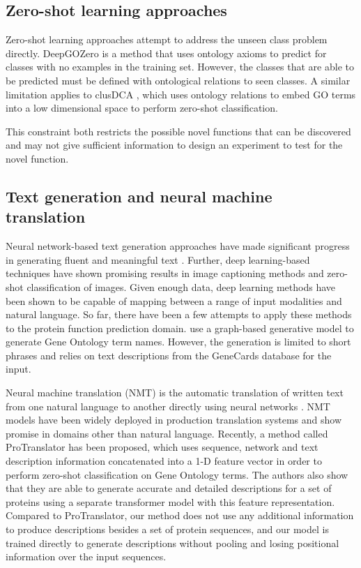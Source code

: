 \documentclass{article}
\begin{document}
	\subsection{Zero-shot learning approaches}
    Zero-shot learning approaches attempt to address the unseen class problem directly.
    DeepGOZero \citep{DeepGOZero} is a method that uses ontology axioms to predict for classes with no examples in the training set.
    However, the classes that are able to be predicted must be defined with ontological relations to seen classes. 
	A similar limitation applies to clusDCA \citep{clusDCA}, which uses ontology relations to embed GO terms into a low dimensional space to perform zero-shot classification.

    This constraint both restricts the possible novel functions that can be discovered and may not give sufficient information to design an experiment to test for the novel function.

    \subsection{Text generation and neural machine translation}
    Neural network-based text generation approaches have made significant progress in generating fluent and meaningful text \citep{fatima2022systematic}. 
    Further, deep learning-based techniques have shown promising results in image captioning methods \citep{hossain2019comprehensive} and zero-shot classification of images\cite{CLIP}.
    Given enough data, deep learning methods have been shown to be capable of mapping between a range of input modalities and natural language.
    So far, there have been a few attempts to apply these methods to the protein function prediction domain.
    \cite{zhang2020automatic} use a graph-based generative model to generate Gene Ontology term names. However, the generation is limited to short phrases and relies on text descriptions from the GeneCards database \cite{GeneCards} for the input.

    Neural machine translation (NMT) is the automatic translation of written text from one natural language to another directly using neural networks \cite{cho2014properties}. NMT models have been widely deployed in production translation systems and show promise in domains other than natural language.
    Recently, a method called ProTranslator \citep{ProTranslator} has been proposed, which uses sequence, network and text description information concatenated into a 1-D feature vector in order to perform zero-shot classification on Gene Ontology terms.
    The authors also show that they are able to generate accurate and detailed descriptions for a set of proteins using a separate transformer model with this feature representation.
    Compared to ProTranslator, our method does not use any additional information to produce descriptions besides a set of protein sequences, and our model is trained directly to generate descriptions without pooling and losing positional information over the input sequences.
\end{document}
